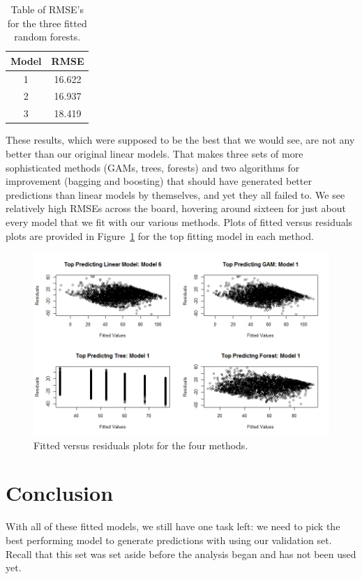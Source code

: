 \documentclass[12pt]{article}\usepackage[]{graphicx}\usepackage[]{color}
\begin{document}
\begin{table}[h]
\centering
\begin{tabular}{|c|c|}
\hline
Model & RMSE \\
\hline
1 & 16.622\\
\hline
2 & 16.937\\
\hline
3 & 18.419\\
\hline
\end{tabular}
\captionsetup{font=footnotesize,labelfont=footnotesize}
\caption{\label{tab:forestres} Table of RMSE's for the three fitted random forests.}
\end{table}

These results, which were supposed to be the best that we would see, are not any better than our original linear models. That makes three sets of more sophisticated methods (GAMs, trees, forests) and two algorithms for improvement (bagging and boosting) that should have generated better predictions than linear models by themselves, and yet they all failed to. We see relatively high RMSEs across the board, hovering around sixteen for just about every model that we fit with our various methods. Plots of fitted versus residuals plots are provided in Figure~\ref{fig:residbyfit} for the top fitting model in each method.

\begin{figure}[h]
	\centering
	\includegraphics[width=\textwidth]{residbyfit.jpeg}
	\captionsetup{font=footnotesize,labelfont=footnotesize}
	\caption{\label{fig:residbyfit} Fitted versus residuals plots for the four methods.}
\end{figure}

\section{Conclusion}
With all of these fitted models, we still have one task left: we need to pick the best performing model to generate predictions with using our validation set. Recall that this set was set aside before the analysis began and has not been used yet.
\end{document}
